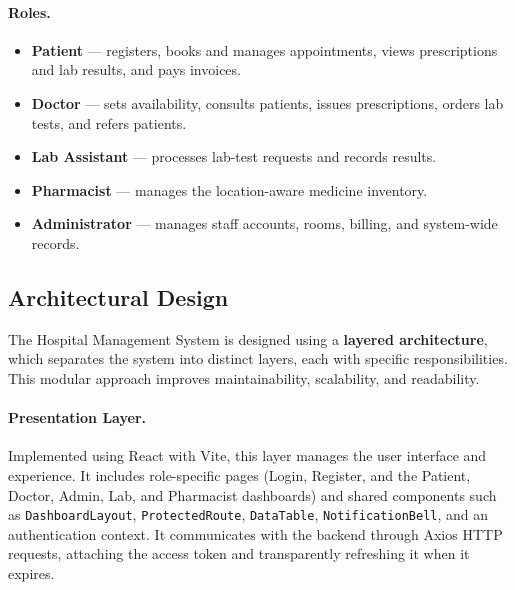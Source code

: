 \documentclass[12pt,a4paper]{report}
\begin{document}
\paragraph{Roles.}
\begin{itemize}[leftmargin=1.4em, itemsep=1pt]
  \item \textbf{Patient} --- registers, books and manages appointments, views
        prescriptions and lab results, and pays invoices.
  \item \textbf{Doctor} --- sets availability, consults patients, issues prescriptions,
        orders lab tests, and refers patients.
  \item \textbf{Lab Assistant} --- processes lab-test requests and records results.
  \item \textbf{Pharmacist} --- manages the location-aware medicine inventory.
  \item \textbf{Administrator} --- manages staff accounts, rooms, billing, and
        system-wide records.
\end{itemize}

\subsection{Architectural Design}
The Hospital Management System is designed using a \textbf{layered architecture}, which
separates the system into distinct layers, each with specific responsibilities. This
modular approach improves maintainability, scalability, and readability.

\paragraph{Presentation Layer.} Implemented using React with Vite, this layer manages
the user interface and experience. It includes role-specific pages (Login, Register,
and the Patient, Doctor, Admin, Lab, and Pharmacist dashboards) and shared components
such as \texttt{DashboardLayout}, \texttt{ProtectedRoute}, \texttt{DataTable},
\texttt{NotificationBell}, and an authentication context. It communicates with the
backend through Axios HTTP requests, attaching the access token and transparently
refreshing it when it expires.
\end{document}
